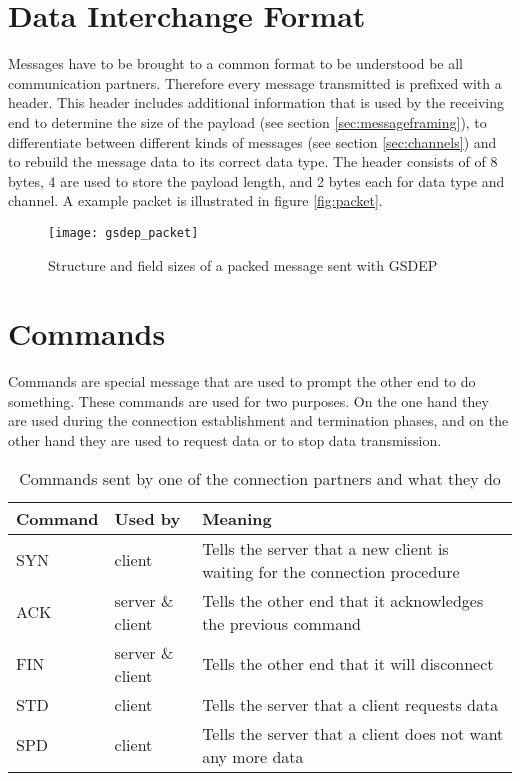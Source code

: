 \section{Data Interchange Format}

Messages have to be brought to a common format to be understood be all communication partners. Therefore every message transmitted is prefixed with a header. This header includes additional information that is used by the receiving end to determine the size of the payload (see section \vref{sec:messageframing}), to differentiate between different kinds of messages (see section \vref{sec:channels}) and to rebuild the message data to its correct data type. The header consists of of 8 bytes, 4 are used to store the payload length, and 2 bytes each for data type and channel. A example packet is illustrated in figure \vref{fig:packet}.

\begin{figure}[h]
    \centering
    \texttt{[image: gsdep\_packet]}
    \caption{Structure and field sizes of a packed message sent with GSDEP}
    \label{fig:packet}
\end{figure}

\section{Commands}
\label{sec:networking_command}

Commands are special message that are used to prompt the other end to do something. These commands are used for two purposes. On the one hand they are used during the connection establishment and termination phases, and on the other hand they are used to request data or to stop data transmission.

\begin{table}[h]
    \centering
    \begin{tabular}{| l | l | p{5cm} |}
    \hline
    \textbf{Command} & \textbf{Used by} & \textbf{Meaning} \\ \hline
    SYN & client & Tells the server that a new client is waiting for the connection procedure \\ \hline
    ACK & server \& client & Tells the other end that it acknowledges the previous command \\ \hline
    FIN & server \& client & Tells the other end that it will disconnect \\ \hline
    STD & client & Tells the server that a client requests data\\ \hline
    SPD & client & Tells the server that a client does not want any more data\\
    \hline
    \end{tabular}
    \caption{Commands sent by one of the connection partners and what they do}
    \label{tab:commands}
\end{table}

